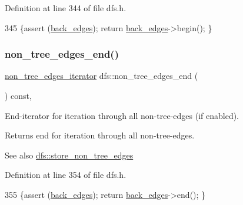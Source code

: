 Definition at line 344 of file dfs.\+h.


\begin{DoxyCode}
345     \{assert (\mbox{\hyperlink{classdfs_a1dc18a7df8d6b238d5301c92fc7540fa}{back\_edges}});  \textcolor{keywordflow}{return} \mbox{\hyperlink{classdfs_a1dc18a7df8d6b238d5301c92fc7540fa}{back\_edges}}->begin(); \}
\end{DoxyCode}
\mbox{\label{classdfs_ad9cd92a18bda23edca8ab3ac60a15ef4}} 
\subsubsection{\texorpdfstring{non\+\_\+tree\+\_\+edges\+\_\+end()}{non\_tree\_edges\_end()}}
{\footnotesize\ttfamily \mbox{\hyperlink{classdfs_a95e353f354d3b31daded0c4fe749171a}{non\+\_\+tree\+\_\+edges\+\_\+iterator}} dfs\+::non\+\_\+tree\+\_\+edges\+\_\+end (\begin{DoxyParamCaption}{ }\end{DoxyParamCaption}) const\hspace{0.3cm}{\ttfamily [inline]}, {\ttfamily [inherited]}}



End-\/iterator for iteration through all non-\/tree-\/edges (if enabled). 

\begin{DoxyReturn}{Returns}
end for iteration through all non-\/tree-\/edges. 
\end{DoxyReturn}
\begin{DoxySeeAlso}{See also}
\mbox{\hyperlink{classdfs_a6f54f1c4339eacc8961e795439d4593d}{dfs\+::store\+\_\+non\+\_\+tree\+\_\+edges}} 
\end{DoxySeeAlso}


Definition at line 354 of file dfs.\+h.


\begin{DoxyCode}
355     \{assert (\mbox{\hyperlink{classdfs_a1dc18a7df8d6b238d5301c92fc7540fa}{back\_edges}}); \textcolor{keywordflow}{return} \mbox{\hyperlink{classdfs_a1dc18a7df8d6b238d5301c92fc7540fa}{back\_edges}}->end(); \}
\end{DoxyCode}
\mbox{\label{classdfs_ae8849a552721ad4af5d9a81c6da35822}} 

